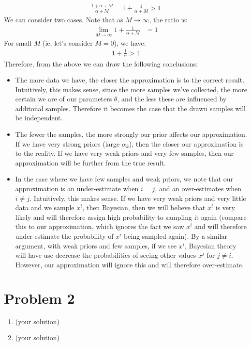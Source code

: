 \documentclass[12pt]{article}
\begin{document}
\begin{enumerate}[label=(\alph*)]
  \begin{align*}
  	\frac{1 + \alpha + M}{\alpha + M} = 1 + \frac{1}{\alpha + M} > 1
  \end{align*}
  We can consider two cases. Note that as $M \to \infty$, the ratio is:
  \begin{align*}
  	\lim_{M \to \infty} 1 + \frac{1}{\alpha + M} &= 1
  \end{align*}
  For small $M$ (ie, let's consider $M = 0$), we have:
  \begin{align*}
  1 + \frac{1}{\alpha} > 1
  \end{align*}
  Therefore, from the above we can draw the following conclusions:
  \begin{itemize}
  	\item The more data we have, the closer the approximation is to the correct result. Intuitively, this makes sense, since the more samples we've collected, the more certain we are of our parameters $\theta$, and the less these are influenced by additonal samples. Therefore it becomes the case that the drawn samples will be independent.
  	\item The fewer the samples, the more strongly our prior affects our approximation. If we have very strong priors (large $\alpha_k$), then the closer our approximation is to the reality. If we have very weak priors and very few samples, then our approximation will be further from the true result.
  	\item In the case where we have few samples and weak priors, we note that our approximation is an under-estimate when $i = j$, and an over-estimates when $i \neq j$. Intuitively, this makes sense. If we have very weak priors and very little data and we sample $x^i$, then Bayesian, then we will believe that $x^i$ is very likely and will therefore assign high probability to sampling it again (compare this to our approximation, which ignores the fact we saw $x^i$ and will therefore under-estimate the probability of $x^i$ being sampled again). By a similar argument, with weak priors and few samples, if we see $x^i$, Bayesian theory will have use decrease the probabilities of seeing other values $x^j$ for $j \neq i$. However, our approximation will ignore this and will therefore over-estimate.
  \end{itemize}

\end{enumerate}

\section*{Problem 2}

\begin{enumerate}[label=(\alph*)]
  \item (your solution)
  \item (your solution)
\end{enumerate}
\end{document}
